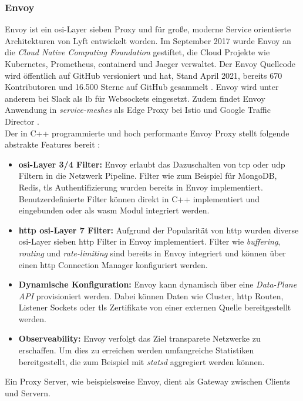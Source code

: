 \subsubsection{Envoy} \label{s:envoy}
Envoy ist ein \ac{osi}-Layer sieben Proxy und für gro{\ss}e, moderne Service orientierte Architekturen von Lyft entwickelt worden.
Im September 2017 wurde Envoy an die \textit{Cloud Native Computing Foundation} gestiftet, die Cloud Projekte wie Kubernetes, Prometheus, containerd und Jaeger verwaltet.
Der Envoy Quellcode wird öffentlich auf GitHub versioniert und hat, Stand April 2021, bereits 670 Kontributoren und 16.500 Sterne auf GitHub gesammelt \cite{EnvoyproxyEnvoy2021}.
Envoy wird unter anderem bei Slack \cite{MigratingMillionsConcurrent2021} als \acl{lb} für Websockets eingesetzt. Zudem findet Envoy Anwendung in \textit{service-meshes} als Edge Proxy bei Istio \cite{Istio} und Google Traffic Director \cite{TrafficDirectorGoogle}.
\\
Der in C++ programmierte und hoch performante Envoy Proxy stellt folgende abstrakte Features bereit \cite{WhatEnvoyEnvoy}:
\begin{itemize}
    \item \textbf{\acs{osi}-Layer 3/4 Filter:} Envoy erlaubt das Dazuschalten von \acs{tcp} oder \acs{udp} Filtern in die Netzwerk Pipeline. Filter wie zum Beispiel für MongoDB, Redis, \ac{tls} Authentifizierung wurden bereits in Envoy implementiert. Benutzerdefinierte Filter können direkt in C++ implementiert und eingebunden oder als \ac{wasm} Modul integriert werden.
    \item \textbf{\acs{http} \ac{osi}-Layer 7 Filter:} Aufgrund der Popularität von \ac{http} wurden diverse \ac{osi}-Layer sieben \ac{http} Filter in Envoy implementiert. Filter wie \textit{buffering}, \textit{routing} und \textit{rate-limiting} sind bereits in Envoy integriert und können über einen \ac{http} Connection Manager konfiguriert werden.
    \item \textbf{Dynamische Konfiguration:} Envoy kann dynamisch über eine \textit{Data-Plane API} provisioniert werden. Dabei können Daten wie Cluster, \ac{http} Routen, Listener Sockets oder \ac{tls} Zertifikate von einer externen Quelle bereitgestellt werden.
    \item \textbf{Observeability:} Envoy verfolgt das Ziel transparete Netzwerke zu erschaffen. Um dies zu erreichen werden umfangreiche Statistiken bereitgestellt, die zum Beispiel mit \textit{statsd} aggregiert werden können.
\end{itemize}
Ein Proxy Server, wie beispielsweise Envoy, dient als Gateway zwischen Clients und Servern.

